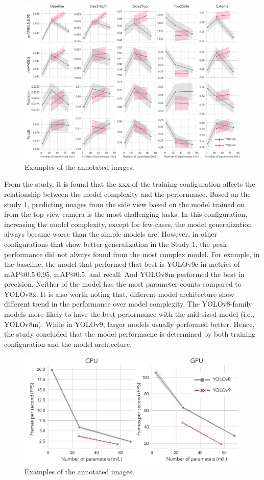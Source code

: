 \begin{figure}[h]
    \centering
    \includegraphics[width=1\textwidth]{figure_4.jpg}
    \caption{Examples of the annotated images.}
    \label{fig:models}
\end{figure}


From the study, it is found that the xxx of the training configuration affects the relationship between the model complexity and the performance. Based on the study 1, predicting images from the side view based on the model trained on from the top-view camera is the most challenging tasks. In this configuration, increasing the model complexity, except for few cases, the model generalization always became worse than the simple models are. However, in other configurations that show better generalization in the Study 1, the peak performance did not always found from the most complex model. For example, in the baseline, the model that performed that best is YOLOv9e in metrics of $\text{mAP@{0.5:0.95}}$, $\text{mAP@{0.5}}$, and recall. And YOLOv8m performed the best in precision. Neither of the model has the most parameter counts compared to YOLOv8x. It is also worth noting that, different model architecture show different trend in the performance over model complexity. The YOLOv8-family models more likely to have the best performance with the mid-sized model (i.e., YOLOv8m). While in YOLOv9, larger models usually performed better. Hence, the study concluded that the model performacne is determined by both training configuration and the model archtecture.


\begin{figure}[h]
    \centering
    \includegraphics[width=.6\textwidth]{figure_6.jpg}
    \caption{Examples of the annotated images.}
    \label{fig:inference}
\end{figure}


